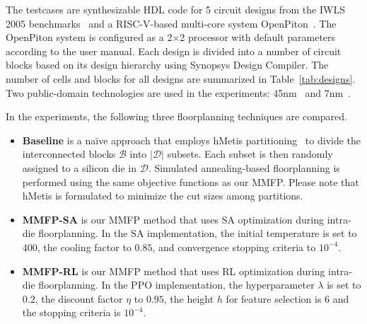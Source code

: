 The testcases are synthesizable HDL code for 5 circuit designs from the IWLS 2005 benchmarks~\cite{albrecht2005iwls} and a RISC-V-based multi-core system OpenPiton~\cite{balkind2016Openpiton}. The OpenPiton system is configured as a 2$\times$2 processor with default parameters according to the user manual. 
Each design is divided into a number of circuit blocks based on its design hierarchy using Synopsys Design Compiler. 
The number of cells and blocks for all designs are summarized in Table~\ref{tab:designs}. Two public-domain technologies are used in the experiments: 45nm~\cite{Stine2007freepdk45} and 7nm~\cite{Vashishtha2017asap7}.



In the experiments, %
the following three floorplanning techniques are compared.
\begin{itemize}
\item \textbf{Baseline} is a na\"ive approach that employs hMetis partitioning~\cite{harypis1997HMetis} to divide the interconnected blocks $\mathcal{B}$ into $|\mathcal{D}|$ subsets. Each subset is then randomly assigned to a silicon die in $\mathcal{D}$. 
Simulated annealing-based floorplanning is performed using the same 
objective functions as our MMFP. 
Please note that hMetis is formulated to minimize the cut sizes among partitions. 

\item \textbf{MMFP-SA} is our MMFP method that uses SA optimization during intra-die floorplanning. In the SA implementation, the initial temperature is set to $400$, the cooling factor to $0.85$, and convergence stopping criteria to $10^{-4}$.

\item \textbf{MMFP-RL} is our MMFP method that uses RL optimization during intra-die floorplanning. In the PPO implementation, the hyperparameter $\lambda$ is set to $0.2$, the discount factor $\eta$ to $0.95$, the height $h$ for feature selection is $6$ and the stopping criteria is $10^{-4}$.
\end{itemize}

